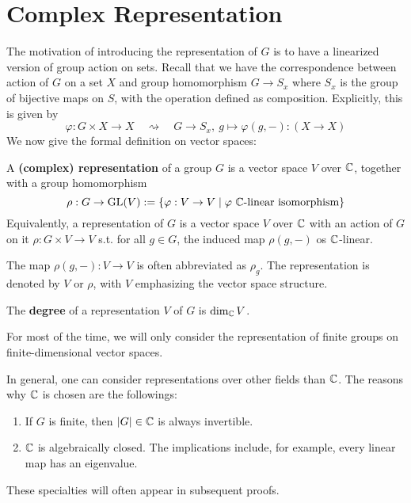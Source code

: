 \documentclass{article}
\begin{document}

\tableofcontents
\newpage

\section{Complex Representation}

\textstart
The motivation of introducing the representation of $G$ is to have a linearized version of group action on sets. Recall that we have the correspondence between action of $G$ on a set $X$ and group homomorphism $G \to S_x$ where $S_x$ is the group of bijective maps on $S$, with the operation defined as composition. Explicitly, this is given by
\[
    \varphi: G \times X \to X \quad \rightsquigarrow \quad G \to S_x,\ g \mapsto \varphi(g, -) : (X \to X) 
\]
We now give the formal definition on vector spaces:

\begin{definition}[Representation]
    A \textbf{(complex) representation} of a group $G$ is a vector space $V$ over $\mathbb{C}$, together with a group homomorphism 
    \[
        \rho: G \to \mathrm{GL}(V) := \{ \varphi: V \to V \mid \varphi \text{ $\mathbb{C}$-linear isomorphism} \}
    \]
    Equivalently, a representation of $G$ is a vector space $V$ over $\mathbb{C}$ with an action of $G$ on it $\rho: G \times V \to V$ s.t. for all $g \in G$, the induced map $\rho(g, -)$ os $\mathbb{C}$-linear.
\end{definition}

\begin{notation}
    The map $\rho(g, -): V \to V$ is often abbreviated as $\rho_g$. The representation is denoted by $V$ or $\rho$, with $V$ emphasizing the vector space structure.
\end{notation}

\begin{definition}
    The \textbf{degree} of a representation $V$ of $G$ is $\dim_{\mathbb{C}}V$. 
\end{definition}

\textstart
For most of the time, we will only consider the representation of finite groups on finite-dimensional vector spaces.

\begin{remark}
    In general, one can consider representations over other fields than $\mathbb{C}$. The reasons why $\mathbb{C}$ is chosen are the followings:
    \begin{enumerate}[label=\arabic*)]
        \item If $G$ is finite, then $\left|G\right| \in \mathbb{C}$ is always invertible.
        \item $\mathbb{C}$ is algebraically closed. The implications include, for example, every linear map has an eigenvalue.
    \end{enumerate}
    These specialties will often appear in subsequent proofs. 
\end{remark}
\end{document}
